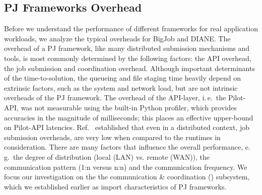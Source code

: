 \documentclass[conference]{IEEEtran}
\begin{document}








\subsection{PJ Frameworks Overhead}\label{sec:pj_performance}

Before we understand the performance of different frameworks for real
application workloads, we analyze the typical overheads for BigJob and
DIANE.  The overhead of a PJ framework, like many distributed
submission mechanisms and tools, is most commonly determined by the
following factors: the API overhead, the job submission and
coordination overhead. Although important determinants of the
time-to-solution, the queueing and file staging time heavily depend on
extrinsic factors, such as the system and network load, but are not
intrinsic overheads of the PJ framework. The overhead of the
API-layer, i.\,e.\ the Pilot-API, was not measurable using the
built-in Python profiler, which provides accuracies in the magnitude
of milliseconds; this places an effective upper-bound on Pilot-API
latencies. Ref.~\cite{saga_europar10} established that even in a
distributed context, job submission overheads, are very low when
compared to the runtimes in consideration.  There are many factors
that influence the overall performance, e.\,g.\ the
degree of distribution (local (LAN) vs. remote (WAN)), the
communication pattern (1:n versus n:n) and the communication
frequency. We focus our investigation on the the communication \& 
coordination (\cc) subsystem, which we established earlier as
import characteristics of PJ frameworks.
\end{document}
